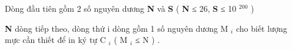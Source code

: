 Dòng đầu tiên gồm 2 số nguyên dương   \textbf{    N   }   và   \textbf{    S   }   (   \textbf{    N   }   ≤ 26,   \textbf{    S   }   ≤ 10   $^    200   $   )  

\textbf{    N   }   dòng tiếp theo, dòng thứ i dòng gồm 1 số nguyên dương M   $_    i   $   cho biết lượng mực cần thiết để in ký tự C   $_    i   $   ( M   $_    i   $   ≤ N ) .